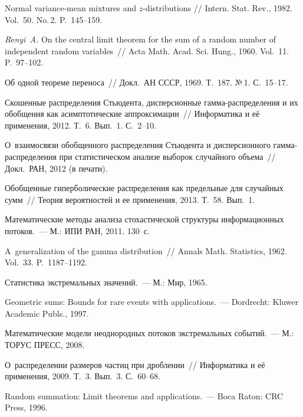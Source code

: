 \begin{multicols}{2}
{{\begin{thebibliography}{99}
 Normal
variance-mean mixtures and $z$-distributions // Intern.
Stat. Rev., 1982. Vol.~50. No.\,2. P.~145--159.

{\it R$\acute{\mbox{e}}$nyi~A.} On the central limit theorem for the sum of a
random number of independent random variables~// Acta Math. Acad.
Sci. Hung., 1960. Vol.~11. P.~97--102.

 Об одной теореме переноса~// 
Докл.\ АН СССР, 1969. Т.~187. №\,1. С.~15--17.

 Скошенные распределения
Стьюдента, дисперсионные гам\-ма-рас\-пре\-де\-ле\-ния и их обобщения как
асимптотические аппроксимации~// Информатика и её применения, 2012.
Т.~6. Вып.~1. С.~2--10.

 О~взаимосвязи обобщенного распределения
Стьюдента и дисперсионного гам\-ма-рас\-пре\-де\-ле\-ния при статистическом
анализе выборок случайного объема~// Докл.\ РАН, 2012 (в печати).

 Обобщенные гиперболические распределения как
предельные для случайных сумм~// Теория вероятностей и ее
применения, 2013. Т.~58. Вып.~1.

Математические методы анализа стохастической структуры
информационных потоков.~--- М.: ИПИ РАН, 2011. 130~с.

 A~generalization of the gamma
distribution~// Annals Math. Statistics, 1962. Vol.~33. P.~1187--1192.

 Статистика экстремальных значений.~--- М.: Мир, 1965.

 Geometric sums: Bounds for rare events with
applications.~--- Dordrecht: Kluwer Academic Publs., 1997.

 Математические модели
неоднородных потоков экстремальных событий.~--- М.: ТОРУС ПРЕСС, 2008.

 О~распределении размеров частиц при
дроблении~// Информатика и её применения, 2009. Т.~3. Вып.~3. С.~60--68.

 Random summation: Limit
theorems and applications.~--- Boca Raton: CRC Press, 1996.


\end{thebibliography}}}
\end{multicols}
